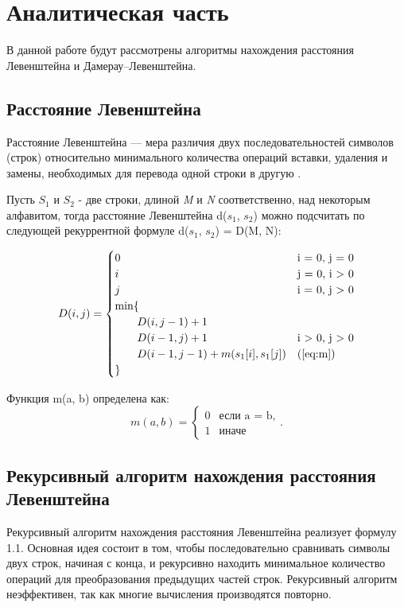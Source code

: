 \chapter{Аналитическая часть}

В данной работе будут рассмотрены алгоритмы нахождения расстояния Левенштейна и Дамерау--Левенштейна.

\section{Расстояние Левенштейна}

Расстояние Левенштейна — мера различия двух последовательностей символов (строк) относительно минимального количества операций вставки, удаления и замены, необходимых для перевода одной строки в другую \cite{levenshtein}.

Пусть $S_{1}$ и $S_{2}$ - две строки, длиной \textit{M} и \textit{N} соответственно, над некоторым алфавитом, тогда расстояние Левенштейна d($s_{1}$, $s_{2}$) можно подсчитать по следующей рекуррентной формуле d($s_{1}$, $s_{2}$) = D(M, N):

\begin{equation}
	\label{eq:D}
	D(i, j) = \begin{cases}
		
		0 &\text{i = 0, j = 0}\\
		i &\text{j = 0, i > 0}\\
		j &\text{i = 0, j > 0}\\
		\min \lbrace \\
		\qquad D(i, j-1) + 1\\
		\qquad D(i-1, j) + 1 &\text{i > 0, j > 0}\\
		\qquad D(i-1, j-1) + m(s_{1}[i], s_{1}[j]) &\text(\ref{eq:m})\\
		\rbrace
	\end{cases}
\end{equation}


Функция m(a, b) определена как:
\begin{equation}
	\label{eq:m}
	m(a, b) = \begin{cases}
		0 &\text{если a = b,}\\
		1 &\text{иначе}
	\end{cases}.
\end{equation}

\section{Рекурсивный алгоритм нахождения расстояния Левенштейна}
Рекурсивный алгоритм нахождения расстояния Левенштейна реализует
формулу 1.1. Основная идея состоит в том, чтобы последовательно сравнивать символы двух строк, начиная с конца, и рекурсивно находить минимальное количество операций для преобразования предыдущих частей строк.
Рекурсивный алгоритм неэффективен, так как многие вычисления производятся повторно.


